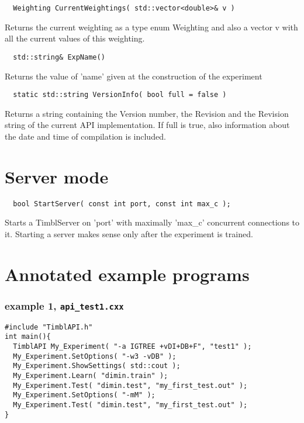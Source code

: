 \documentclass{report}
\begin{document}
\begin{footnotesize}
\begin{verbatim}
  Weighting CurrentWeightings( std::vector<double>& v )
\end{verbatim}
\end{footnotesize}

Returns the current weighting as a type enum Weighting and also a
vector v with all the current values of this weighting.

\begin{footnotesize}
\begin{verbatim}
  std::string& ExpName()
\end{verbatim}
\end{footnotesize}

Returns the value of 'name' given at the construction of the experiment

\begin{footnotesize}
\begin{verbatim}
  static std::string VersionInfo( bool full = false )
\end{verbatim}
\end{footnotesize}

Returns a string containing the Version number, the Revision and the
Revision string of the current API implementation. If full is true,
also information about the date and time of compilation is included.

\chapter{Server mode}
\label{Using TiMBL as a Server}

\begin{footnotesize}
\begin{verbatim}
  bool StartServer( const int port, const int max_c );
\end{verbatim}
\end{footnotesize}

Starts a TimblServer on 'port' with maximally 'max\_c' concurrent
connections to it. Starting a server makes sense only after the
experiment is trained.

\clearpage
\chapter{Annotated example programs}

\subsection{example 1, {\tt api\_test1.cxx}}
\begin{footnotesize}
\begin{verbatim}	
#include "TimblAPI.h"
int main(){
  TimblAPI My_Experiment( "-a IGTREE +vDI+DB+F", "test1" );
  My_Experiment.SetOptions( "-w3 -vDB" );
  My_Experiment.ShowSettings( std::cout );
  My_Experiment.Learn( "dimin.train" );  
  My_Experiment.Test( "dimin.test", "my_first_test.out" );  
  My_Experiment.SetOptions( "-mM" );
  My_Experiment.Test( "dimin.test", "my_first_test.out" );  
}
\end{verbatim}
\end{footnotesize}
\end{document}
